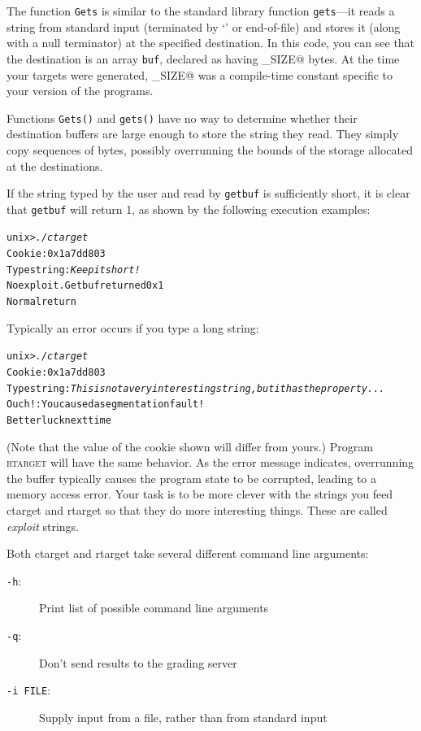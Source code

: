\documentclass[11pt]{article}
\newenvironment{tty}%
{\small\begin{alltt}}%
{\end{alltt}}
\begin{document}
The function {\tt Gets} is similar to the standard library function
{\tt gets}---it reads a string from standard input (terminated by
`\verb@\n@' or end-of-file) and stores it (along with a null
terminator) at the specified destination.  In this code, you can see
that the destination is an array {\tt buf}, declared as having
\verb@BUFFER_SIZE@ bytes.  At the time your targets were
generated, \verb@BUFFER_SIZE@ was a compile-time constant
specific to your version of the programs.

Functions {\tt Gets()} and {\tt gets()} have no way to determine
whether their destination buffers
are large enough to store the string they read.  They simply copy
sequences of bytes,
possibly overrunning the bounds of the storage
allocated at the destinations.

If the string typed by the user and read by {\tt getbuf} is
sufficiently short, 
it is clear that {\tt getbuf} will return 1, as shown
by the following execution examples:

\begin{tty}
    unix>{\em ./ctarget}
    Cookie: 0x1a7dd803
    Type string:{\em Keep it short!}
    No exploit.  Getbuf returned 0x1
    Normal return
\end{tty}

Typically an error occurs if you type a long string:

\begin{tty}
    unix>{\em ./ctarget}
    Cookie: 0x1a7dd803
    Type string:{\em This is not a very interesting string, but it has the property ...}
    Ouch!: You caused a segmentation fault!
    Better luck next time
\end{tty}

(Note that
the value of the cookie shown will differ from yours.)
Program \textsc{rtarget} will have the same behavior.  
As the error message indicates, overrunning the buffer typically
causes the program state to be corrupted, leading to a memory access
error.  Your task is to be more clever with the strings you feed {\sc
ctarget} and {\sc rtarget} so that they do more interesting things.  These are called
{\em exploit} strings.

Both {\sc ctarget} and {\sc rtarget} take several different command line arguments:
\begin{description}
\item[{\tt -h}:] Print list of possible command line arguments
\item[{\tt -q}:] Don't send results to the grading server
\item[{\tt -i FILE}:] Supply input from a file, rather than from
  standard input
\end{description}
\end{document}
